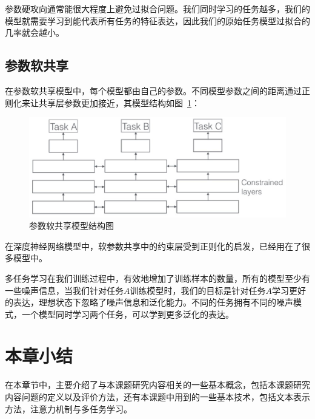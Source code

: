 参数硬攻向通常能很大程度上避免过拟合问题。我们同时学习的任务越多，我们的模型就需要学习到能代表所有任务的特征表达，因此我们的原始任务模型过拟合的几率就会越小。

\subsection{参数软共享}
在参数软共享模型中，每个模型都由自己的参数。不同模型参数之间的距离通过正则化来让共享层参数更加接近，其模型结构如图~\ref{fig:soft_share}：

\begin{figure}[t!]
    \centering
    \includegraphics[scale=0.5, clip=true]{./sources/soft_share.eps}
    \vspace{-10pt}
    \caption{\label{fig:soft_share} 参数软共享模型结构图}
    \vspace{-5pt}
\end{figure}

在深度神经网络模型中，软参数共享中的约束层受到正则化的启发，已经用在了很多模型中。

多任务学习在我们训练过程中，有效地增加了训练样本的数量，所有的模型至少有一些噪声信息，当我们针对任务$A$训练模型时，我们的目标是针对任务$A$学习更好的表达，理想状态下忽略了噪声信息和泛化能力。不同的任务拥有不同的噪声模式，一个模型同时学习两个任务，可以学到更多泛化的表达。

\section{本章小结}
在本章节中，主要介绍了与本课题研究内容相关的一些基本概念，包括本课题研究内容问题的定义以及评价方法，还有本课题中用到的一些基本技术，包括文本表示方法，注意力机制与多任务学习。

